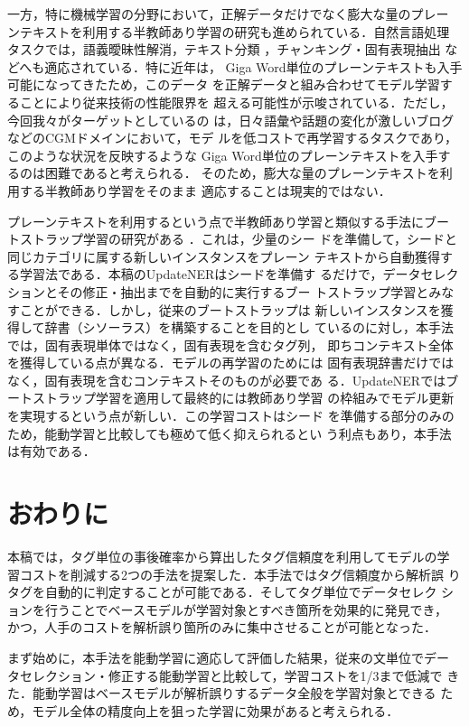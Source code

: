 \documentclass[japanese]{jnlp_1.4}
\begin{document}
一方，特に機械学習の分野において，正解データだけでなく膨大な量のプレー
ンテキストを利用する半教師あり学習の研究も進められている．自然言語処理
タスクでは，語義曖昧性解消\cite{Yarowsky:WSD1995}，テキスト分類
\cite{Fujino:SemiSupervised2008}，チャンキング・固有表現抽出
\cite{suzuki-isozaki:2008:ACLMain}などへも適応されている．特に近年は，
Giga Word単位のプレーンテキストも入手可能になってきたため，このデータ
を正解データと組み合わせてモデル学習することにより従来技術の性能限界を
超える可能性が示唆されている．ただし，今回我々がターゲットとしているの
は，日々語彙や話題の変化が激しいブログなどのCGMドメインにおいて，モデ
ルを低コストで再学習するタスクであり，このような状況を反映するような
Giga Word単位のプレーンテキストを入手するのは困難であると考えられる．
そのため，膨大な量のプレーンテキストを利用する半教師あり学習をそのまま
適応することは現実的ではない．

プレーンテキストを利用するという点で半教師あり学習と類似する手法にブー
トストラップ学習の研究がある
\cite{Etzioni2005,pantel-pennacchiotti:2006:COLACL}．これは，少量のシー
ドを準備して，シードと同じカテゴリに属する新しいインスタンスをプレーン
テキストから自動獲得する学習法である．本稿のUpdateNERはシードを準備す
るだけで，データセレクションとその修正・抽出までを自動的に実行するブー
トストラップ学習とみなすことができる．しかし，従来のブートストラップは
新しいインスタンスを獲得して辞書（シソーラス）を構築することを目的とし
ているのに対し，本手法では，固有表現単体ではなく，固有表現を含むタグ列，
即ちコンテキスト全体を獲得している点が異なる．モデルの再学習のためには
固有表現辞書だけではなく，固有表現を含むコンテキストそのものが必要であ
る．UpdateNERではブートストラップ学習を適用して最終的には教師あり学習
の枠組みでモデル更新を実現するという点が新しい．この学習コストはシード
を準備する部分のみのため，能動学習と比較しても極めて低く抑えられるとい
う利点もあり，本手法は有効である．

\section{おわりに}
\label{sec-conclusion}

本稿では，タグ単位の事後確率から算出したタグ信頼度を利用してモデルの学
習コストを削減する2つの手法を提案した．本手法ではタグ信頼度から解析誤
りタグを自動的に判定することが可能である．そしてタグ単位でデータセレク
ションを行うことでベースモデルが学習対象とすべき箇所を効果的に発見でき，
かつ，人手のコストを解析誤り箇所のみに集中させることが可能となった．

まず始めに，本手法を能動学習に適応して評価した結果，従来の文単位でデー
タセレクション・修正する能動学習と比較して，学習コストを1/3まで低減で
きた．能動学習はベースモデルが解析誤りするデータ全般を学習対象とできる
ため，モデル全体の精度向上を狙った学習に効果があると考えられる．
\end{document}
